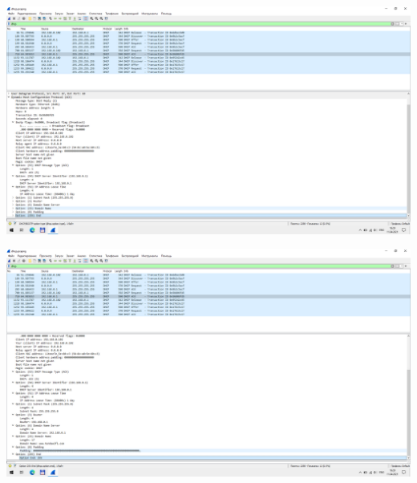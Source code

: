 \includegraphics[width=\textwidth]{screenshots/dhcp_ack2_1}

\includegraphics[width=\textwidth]{screenshots/dhcp_ack2_2}
